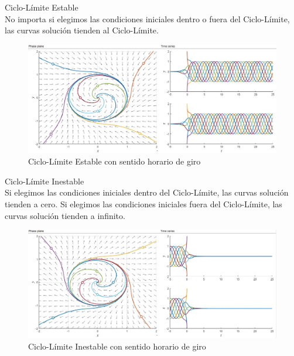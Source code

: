 \documentclass[12pt,a4paper]{report} %
\begin{document}
		{\Large\textbullet\quad Ciclo-Límite Estable}\\[0.5cm]
		
		No importa si elegimos las condiciones iniciales dentro o fuera del Ciclo-Límite, las curvas solución tienden al Ciclo-Límite.
		
		\begin{figure}[h]
			\centering
			\includegraphics[width=1\textwidth]{cle.jpg}
			\caption{Ciclo-Límite Estable con sentido horario de giro}
			\label{fig:cle}
		\end{figure}\smallskip

	\newpage
		
	{\Large\textbullet\quad Ciclo-Límite Inestable}\\[0.5cm]
	
	Si elegimos las condiciones iniciales dentro del Ciclo-Límite, las curvas solución tienden a cero. Si elegimos las condiciones iniciales fuera del Ciclo-Límite, las curvas solución tienden a infinito.
	
	\begin{figure}[h]
		\centering
		\includegraphics[width=1\textwidth]{cli.jpg}
		\caption{Ciclo-Límite Inestable con sentido horario de giro}
		\label{fig:cli}
	\end{figure}\smallskip
	
	\vspace{0.5cm}{\Large\textbullet\quad Ciclo-Límite Parcialmente Estable}\\[0.5cm]
	
\end{document}
